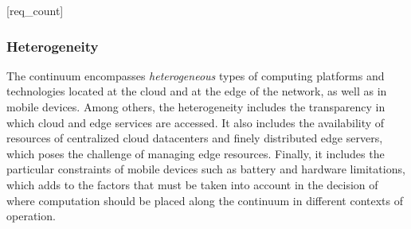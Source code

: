 [req_count]

\subsubsection*{Heterogeneity}\label{sec:heterogeneity}


The continuum encompasses \textit{heterogeneous} types of computing platforms and technologies located at the cloud and at the edge of the network, as well as in mobile devices. Among others, the heterogeneity includes the transparency in which cloud and edge services are accessed. 
It also includes the availability of resources of centralized cloud datacenters and finely distributed edge servers, which poses the challenge of managing edge resources. 
Finally, it includes the particular constraints of mobile devices such as battery and hardware limitations, which adds to the factors that must be taken into account in the decision of where computation should be placed along the continuum in different contexts of operation.








